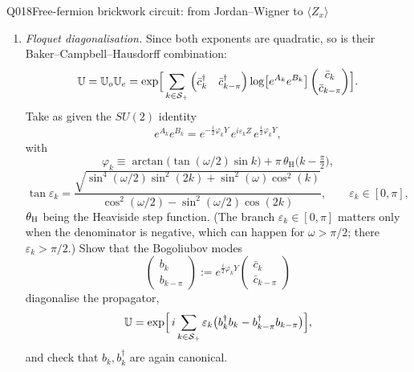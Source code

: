 \begin{entry}{Q018}{Free-fermion brickwork circuit: from Jordan--Wigner to $\langle Z_x\rangle$}
\begin{problem}
\begin{enumerate}[label=\textbf{(\alph*)},leftmargin=*]
  \item \emph{Floquet diagonalisation.} Since both exponents are quadratic, so is their
        Baker--Campbell--Hausdorff combination:
        \[
          \mathbb U=\mathbb U_o\mathbb U_e
          =\exp\Bigl[\,\sum_{k\in\mathcal S_+}
            \begin{pmatrix}\bar c^{\dagger}_k&\bar c^{\dagger}_{k-\pi}\end{pmatrix}
            \log\bigl[e^{A_k}e^{B_k}\bigr]
            \begin{pmatrix}\bar c_k\\ \bar c_{k-\pi}\end{pmatrix}\Bigr].
        \]
        Take as given the $SU(2)$ identity
        \[
          e^{A_k}e^{B_k}
          =e^{-\frac{i}{2}\varphi_kY}\,e^{i\varepsilon_kZ}\,e^{\frac{i}{2}\varphi_kY},
        \]
        with
        \[
          \varphi_k\equiv\arctan\bigl(\tan(\omega/2)\sin k\bigr)
            +\pi\,\theta_{\text{H}}\!\bigl(k-\tfrac{\pi}{2}\bigr),
        \]
        \[
          \tan\varepsilon_k=
            \frac{\sqrt{\sin^{4}(\omega/2)\sin^{2}(2k)+\sin^{2}(\omega)\cos^{2}(k)}}
                 {\cos^{2}(\omega/2)-\sin^{2}(\omega/2)\cos(2k)},
          \qquad \varepsilon_k\in[0,\pi],
        \]
        $\theta_{\text H}$ being the Heaviside step function. (The branch
        $\varepsilon_k\in[0,\pi]$ matters only when the denominator is negative, which
        can happen for $\omega>\pi/2$; there $\varepsilon_k>\pi/2$.) Show that the
        Bogoliubov modes
        \[
          \begin{pmatrix}b_k\\ b_{k-\pi}\end{pmatrix}
          :=e^{\frac{i}{2}\varphi_kY}\begin{pmatrix}\bar c_k\\ \bar c_{k-\pi}\end{pmatrix}
        \]
        diagonalise the propagator,
        \[
          \mathbb U=\exp\Bigl[\,i\sum_{k\in\mathcal S_+}
            \varepsilon_k\bigl(b^{\dagger}_kb_k-b^{\dagger}_{k-\pi}b_{k-\pi}\bigr)\Bigr],
        \]
        and check that $b_k,b^{\dagger}_k$ are again canonical.
 

\end{enumerate}
\end{problem}
\end{entry}

